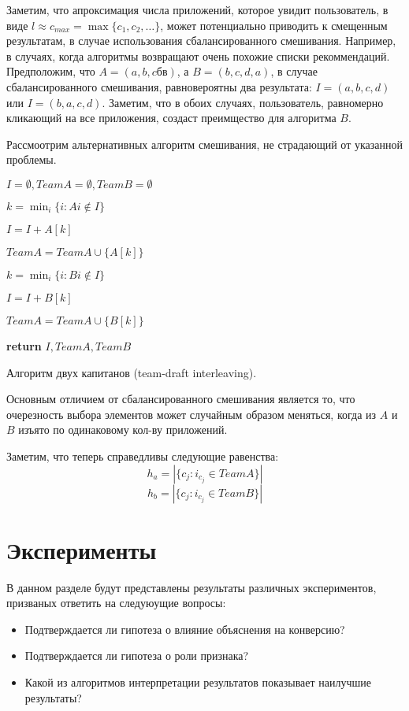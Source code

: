 \documentclass[12pt,a4paper]{report}
\begin{document}
Заметим, что апроксимация числа приложений, которое увидит пользователь, в виде $l \approx c_{max} = \max\{c_1,c_2,\dots\}$, может потенциально приводить к смещенным результатам, в случае использования сбалансированного смешивания. Например, в случаях, когда алгоритмы возвращают очень похожие списки рекоммендаций. Предположим, что $A = (a, b, cб в)$, а $B = (b, c, d, a)$, в случае сбалансированного смешивания, равновероятны два результата: $I=(a, b, c, d)$ или $I=(b, a, c, d)$. Заметим, что в обоих случаях, пользователь, равномерно кликающий на все приложения, создаст преимщество для алгоритма $B$.

Рассмоотрим альтернативных алгоритм смешивания, не страдающий от указанной проблемы.


\begin{algorithm}[H]
\SetAlgoLined
{}
$I = \emptyset, TeamA = \emptyset, TeamB = \emptyset$

 {
	 {
		$k=\min_i\{i: A{i}\notin I\}$
		
		$I = I + A[k]$
		
		$TeamA = TeamA \cup \{A[k]\}$
	} {
		$k=\min_i\{i: B{i}\notin I\}$
				
		$I = I + B[k]$
		
		$TeamA = TeamA \cup \{B[k]\}$
	}
}
\textbf{return} $I, TeamA, TeamB$
\caption{Алгоритм двух капитанов (team-draft interleaving).}
\label{alg:BI}
\end{algorithm}

Основным отличием от сбалансированного смешивания является то, что очерезность выбора элементов может случайным образом меняться, когда из $A$ и $B$ изъято по одинаковому кол-ву приложений.

Заметим, что теперь справедливы следующие равенства:
\begin{equation*}
h_a = |\{c_j: i_{c_j} \in TeamA\}|
\end{equation*}
\begin{equation*}
h_b = |\{c_j: i_{c_j} \in TeamB\}|
\end{equation*}

\section{Эксперименты}
В данном разделе будут представлены результаты различных экспериментов, призваных ответить на следуюущие вопросы:
\begin{itemize}
\item Подтверждается ли гипотеза о влияние объяснения на конверсию?
\item Подтверждается ли гипотеза о роли признака?
\item Какой из алгоритмов интерпретации результатов показывает наилучшие результаты?
\end{itemize}
\end{document}

